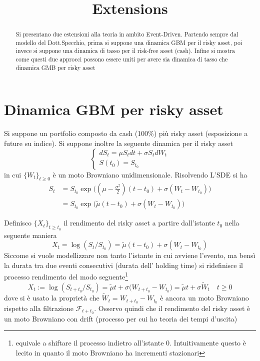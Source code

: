 \documentclass[12pt]{article}
\title{Extensions}
\author{}
\theoremstyle{break}
\begin{document}
\maketitle

\begin{abstract}
	Si presentano due estensioni alla teoria in ambito Event-Driven. Partendo sempre dal modello del Dott.Specchio, prima si suppone una dinamica GBM per il risky asset, poi invece si suppone una dinamica di tasso per il risk-free asset (cash). Infine si mostra come questi due approcci possono essere uniti per avere sia dinamica di tasso che dinamica GMB per risky asset
\end{abstract}

\section{Dinamica GBM per risky asset}
Si suppone un portfolio composto da cash (100\%) più risky asset (esposizione a future su indice). Si suppone inoltre la seguente dinamica per il risky asset 
\[
\begin{cases}
dS_t = \mu S_tdt + \sigma S_t dW_t  \\
S(t_0) = S_{t_0}
\end{cases}
\]
in cui $\{W_t\}_{t\geq0}$ è un moto Browniano unidimensionale. Risolvendo L'SDE si ha 
\begin{align}
S_t & = S_{t_0} \exp\big((\mu - \frac{\sigma^2}{2})(t - t_0) + \sigma (W_t - W_{t_0})\big) \\
    & = S_{t_0} \exp\big(\tilde{\mu}(t - t_0) + \sigma (W_t - W_{t_0})\big)
\end{align}

Definisco $\{X_t\}_{t\geq t_0}$ il rendimento del risky asset a partire dall'istante $t_0$ nella seguente maniera \[ X_t = \log(S_t/S_{t_0}) = \tilde{\mu}(t - t_0) + \sigma (W_t - W_{t_0})
\]
Siccome  si vuole modellizzare non tanto l'istante in cui avviene l'evento, ma bensì la durata tra due eventi consecutivi (durata dell' holding time) si ridefinisce il processo rendimento del modo seguente\footnote{equivale a shiftare il processo indietro all'istante 0. Intuitivamente questo è lecito in quanto il moto Browniano ha incrementi stazionari} \[ X_t := \log(S_{t + t_0}/S_{t_0}) = \tilde{\mu}t + \sigma \big(W_{t + t_0} - W_{t_0}\big) = \tilde{\mu}t + \sigma\widetilde{W}_{t} \quad t \geq 0
\]
dove si è usato la proprietà che $\widetilde{W}_t = W_{t + t_0} - W_{t_0}$ è ancora un moto Browniano rispetto alla filtrazione $\mathcal{F}_{t + t_0}$. Osservo quindi che il rendimento del risky asset è un moto Browniano con drift (processo per cui ho teoria dei tempi d'uscita)
\end{document}
